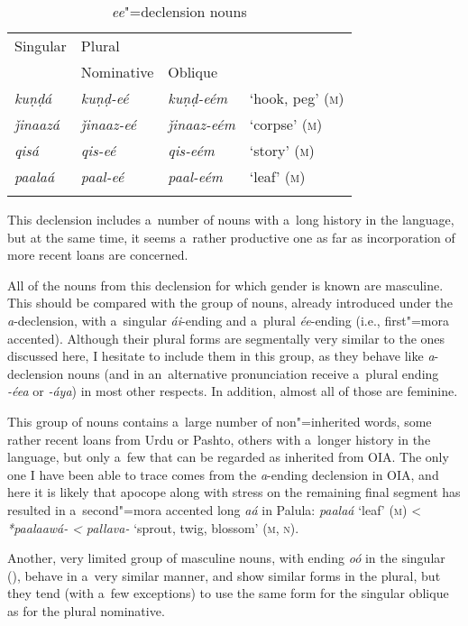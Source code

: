 \begin{table}[ht]
 \label{bkm:Ref193698864}
 \caption{\textit{ee}"=declension nouns}
\begin{tabularx}{\textwidth}{ Q Q Q Q }
\lsptoprule
Singular
&
Plural\\
&
Nominative &
Oblique &
\\\hline
\textit{kuṇḍá} &
\textit{kuṇḍ-eé} &
\textit{kuṇḍ-eém} &
`hook, peg' (\textsc{m})\\
\textit{ǰinaazá} &
\textit{ǰinaaz-eé} &
\textit{ǰinaaz-eém} &
`corpse' (\textsc{m})\\
\textit{qisá} &
\textit{qis-eé} &
\textit{qis-eém} &
`story' (\textsc{m})\\
\textit{paalaá} &
\textit{paal-eé} &
\textit{paal-eém} &
`leaf' (\textsc{m})\\\lspbottomrule
\end{tabularx}
\label{tab:4-18}
\end{table}

This declension includes a~number of nouns with a~long history in the language, but at the same time, it seems a~rather productive one as far as incorporation of more recent loans are concerned.


All of the nouns from this declension for which gender is known are masculine. This should be compared with the group of nouns, already introduced under the \textit{a}-declension, with a~singular \textit{ái}-ending and a~plural \textit{ée}-ending (i.e., first"=mora accented). Although their plural forms are segmentally very similar to the ones discussed here, I hesitate to include them in this group, as they behave like \textit{a}-declension nouns (and in an~alternative pronunciation receive a~plural ending \textit{-éea} or \textit{-áya}) in most other respects. In addition, almost all of those are feminine.


This group of nouns contains a~large number of non"=inherited words, some rather recent loans from Urdu or Pashto, others with a~longer history in the language, but only a~few that can be regarded as inherited from OIA. The only one I have been able to trace comes from the \textit{a}-ending declension in OIA, and here it is likely that apocope along with stress on the remaining final segment has resulted in a~second"=mora accented long \textit{aá} in Palula: \textit{paalaá} `leaf' (\textsc{m}) {\textless} \textit{*paalaawá-} \textit{{\textless} pallava-} `sprout, twig, blossom' (\textsc{m}, \textsc{n}).


Another, very limited group of masculine nouns, with ending \textit{oó} in the singular (), behave in a~very similar manner, and show similar forms in the plural, but they tend (with a~few exceptions) to use the same form for the singular oblique as for the plural nominative. 



